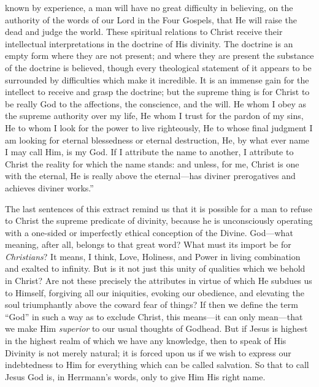 \documentclass[12pt,a5paper,oneside]{book}
\begin{document}
known by experience, a man will have no great
difficulty in believing, on the authority of the
words of our Lord in the Four Gospels, that
He will raise the dead and judge the world.
These spiritual relations to Christ receive their
intellectual interpretations in the doctrine of
His divinity. The doctrine is an empty form
where they are not present; and where they
are present the substance of the doctrine is
believed, though every theological statement
of it appears to be surrounded by difficulties
which make it incredible. It is an immense
gain for the intellect to receive and grasp
the doctrine; but the supreme thing is for
Christ to be really God to the affections, the
conscience, and the will. He whom I obey
as the supreme authority over my life, He whom
I trust for the pardon of my sins, He to whom
I look for the power to live righteously, He to
whose final judgment I am looking for eternal
blessedness or eternal destruction, He, by what
ever name I may call Him, is my God. If
I attribute the name to another, I attribute to
Christ the reality for which the name stands:
and unless, for me, Christ is one with the
eternal, He is really above the eternal---has
diviner prerogatives and achieves diviner works.''

The last sentences of this extract remind us
that it is possible for a man to refuse to Christ
the supreme predicate of divinity, because he is
unconsciously operating with a one-sided or imperfectly 
ethical conception of the Divine. God---what 
meaning, after all, belongs to that great
word? What must its import be for \textit{Christians}?
It means, I think, Love, Holiness, and Power
in living combination and exalted to infinity.
But is it not just this unity of qualities which
we behold in Christ? Are not these precisely
the attributes in virtue of which He subdues
us to Himself, forgiving all our iniquities,
evoking our obedience, and elevating the soul
triumphantly above the coward fear of things?
If then we define the term ``God'' in such a
way as to exclude Christ, this means---it can
only mean---that we make Him \textit{superior} to our
usual thoughts of Godhead. But if Jesus is
highest in the highest realm of which we have
any knowledge, then to speak of His Divinity
is not merely natural; it is forced upon us
if we wish to express our indebtedness to Him
for everything which can be called salvation.
So that to call Jesus God is, in Herrmann's
words, only to give Him His right name.
\end{document}

